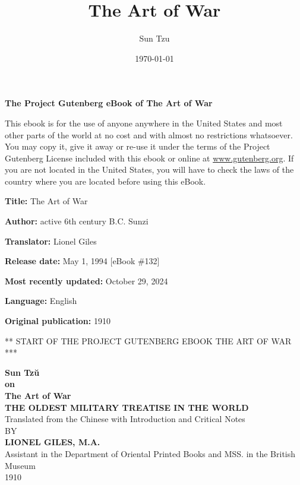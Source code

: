 \documentclass[10pt,a4paper]{book}
\title{The Art of War}
\author{Sun Tzu}
\date{\today}
\begin{document}
\maketitle
\thispagestyle{empty}

\begin{center}
{\small \textbf{The Project Gutenberg eBook of The Art of War}}
\end{center}


\noindent
This ebook is for the use of anyone anywhere in the United States and most other parts of the world at no cost and with almost no restrictions whatsoever. You may copy it, give it away or re-use it under the terms of the Project Gutenberg License included with this ebook or online at \url{www.gutenberg.org}. If you are not located in the United States, you will have to check the laws of the country where you are located before using this eBook.

\vspace{1em}

\textbf{Title:} The Art of War

\textbf{Author:} active 6th century B.C. Sunzi

\textbf{Translator:} Lionel Giles

\textbf{Release date:} May 1, 1994 [eBook \#132]

\textbf{Most recently updated:} October 29, 2024

\textbf{Language:} English

\textbf{Original publication:} 1910

\vspace{2em}

\begin{center}
{\footnotesize *** START OF THE PROJECT GUTENBERG EBOOK THE ART OF WAR ***}
\end{center}


\newpage

\thispagestyle{empty}
\begin{center}
{\Huge \textbf{Sun Tzŭ}} \\[2em]
{\Huge \textbf{on}} \\[2em]
{\Huge \textbf{The Art of War}} \\[2em]
\textbf{THE OLDEST MILITARY TREATISE IN THE WORLD} \\[1em]
Translated from the Chinese with Introduction and Critical Notes \\[1em]
BY \\[3em]
\textbf{LIONEL GILES, M.A.} \\[1em]
Assistant in the Department of Oriental Printed Books and MSS. in the British Museum \\[0.5em]
1910
\end{center}
\end{document}
